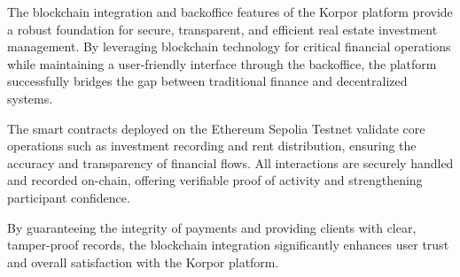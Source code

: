 The blockchain integration and backoffice features of the Korpor platform provide a robust foundation for secure, transparent, and efficient real estate investment management. By leveraging blockchain technology for critical financial operations while maintaining a user-friendly interface through the backoffice, the platform successfully bridges the gap between traditional finance and decentralized systems.

The smart contracts deployed on the Ethereum Sepolia Testnet validate core operations such as investment recording and rent distribution, ensuring the accuracy and transparency of financial flows. All interactions are securely handled and recorded on-chain, offering verifiable proof of activity and strengthening participant confidence.

By guaranteeing the integrity of payments and providing clients with clear, tamper-proof records, the blockchain integration significantly enhances user trust and overall satisfaction with the Korpor platform. 